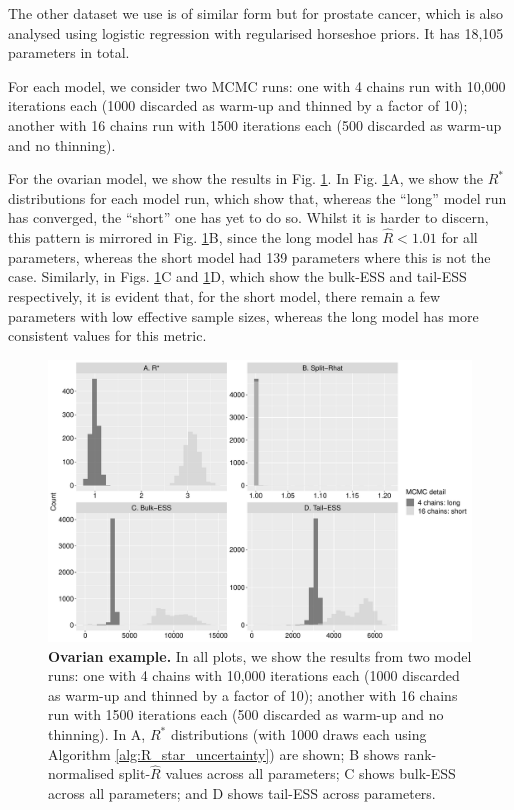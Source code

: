 \documentclass{article}
\begin{document}
The other dataset we use is of similar form but for prostate cancer, which is also analysed using logistic regression with regularised horseshoe priors. It has 18,105 parameters in total.

For each model, we consider two MCMC runs: one with 4 chains run with 10,000 iterations each (1000 discarded as warm-up and thinned by a factor of 10); another with 16 chains run with 1500 iterations each (500 discarded as warm-up and no thinning).

For the ovarian model, we show the results in Fig. \ref{fig:ovarian}. In Fig. \ref{fig:ovarian}A, we show the $R^*$ distributions for each model run, which show that, whereas the ``long'' model run has converged, the ``short'' one has yet to do so. Whilst it is harder to discern, this pattern is mirrored in Fig. \ref{fig:ovarian}B, since the long model has $\widehat{R}<1.01$ for all parameters, whereas the short model had 139 parameters where this is not the case. Similarly, in Figs. \ref{fig:ovarian}C and \ref{fig:ovarian}D, which show the bulk-ESS and tail-ESS respectively, it is evident that, for the short model, there remain a few parameters with low effective sample sizes, whereas the long model has more consistent values for this metric.

\begin{figure}[!htb]
	\centerline{\includegraphics[width=1.0\textwidth]{../output/ovarian.pdf}}
	\caption{\textbf{Ovarian example.} In all plots, we show the results from two model runs: one with 4 chains with 10,000 iterations each (1000 discarded as warm-up and thinned by a factor of 10); another with 16 chains run with 1500 iterations each (500 discarded as warm-up and no thinning). In A, $R^*$ distributions (with 1000 draws each using Algorithm \ref{alg:R_star_uncertainty}) are shown; B shows rank-normalised split-$\widehat{R}$ values across all parameters; C shows bulk-ESS across all parameters; and D shows tail-ESS across parameters.}
	\label{fig:ovarian}
\end{figure}
\end{document}
